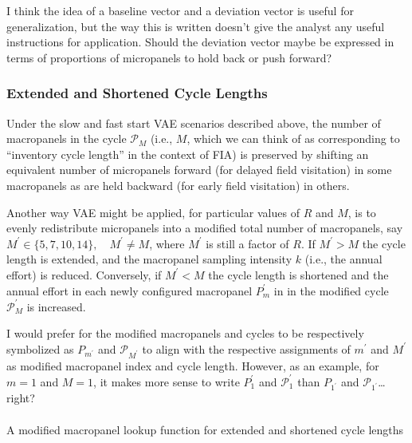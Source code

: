 \documentclass[
  number]{elsarticle}
\makeatletter
\let\oldparagraph\paragraph
\renewcommand{\paragraph}{
    \@ifstar
      \xxxParagraphStar
      \xxxParagraphNoStar
  }
\newcommand{\xxxParagraphStar}[1]{\oldparagraph*{#1}\mbox{}}
\newcommand{\xxxParagraphNoStar}[1]{\oldparagraph{#1}\mbox{}}
\makeatother
\begin{document}
{I think the idea of a baseline vector and a deviation vector is useful
for generalization, but the way this is written doesn't give the analyst
any useful instructions for application. Should the deviation vector
maybe be expressed in terms of proportions of micropanels to hold back
or push forward?}

\subsubsection{Extended and Shortened Cycle
Lengths}\label{extended-and-shortened-cycle-lengths}

Under the slow and fast start VAE scenarios described above, the number
of macropanels in the cycle \(\mathcal{P}_M\) (i.e., \(M\), which we can
think of as corresponding to ``inventory cycle length'' in the context
of FIA) is preserved by shifting an equivalent number of micropanels
forward (for delayed field visitation) in some macropanels as are held
backward (for early field visitation) in others.

Another way VAE might be applied, for particular values of \(R\) and
\(M\), is to evenly redistribute micropanels into a modified total
number of macropanels, say
\(M^{\prime} \in \{5,7,10,14\}, \quad M^{\prime} \neq M\), where
\(M^{\prime}\) is still a factor of \(R\). If \(M^{\prime} > M\) the
cycle length is extended, and the macropanel sampling intensity \(k\)
(i.e., the annual effort) is reduced. Conversely, if \(M^{\prime} < M\)
the cycle length is shortened and the annual effort in each newly
configured macropanel \(P^\prime_m\) in in the modified cycle
\(\mathcal{P}^\prime_M\) is increased.

{I would prefer for the modified macropanels and cycles to be
respectively symbolized as \(P_{m^\prime}\) and
\(\mathcal{P}_{M^\prime}\) to align with the respective assignments of
\(m^\prime\) and \(M^\prime\) as modified macropanel index and cycle
length. However, as an example, for \(m = 1\) and \(M = 1\), it makes
more sense to write \(P^\prime_1\) and \(\mathcal{P}^\prime_1\) than
\(P_{1^\prime}\) and \(\mathcal{P}_{1^\prime}\)\ldots right?}

\paragraph{A modified macropanel lookup function for extended and
shortened cycle
lengths}\label{a-modified-macropanel-lookup-function-for-extended-and-shortened-cycle-lengths}
\end{document}
